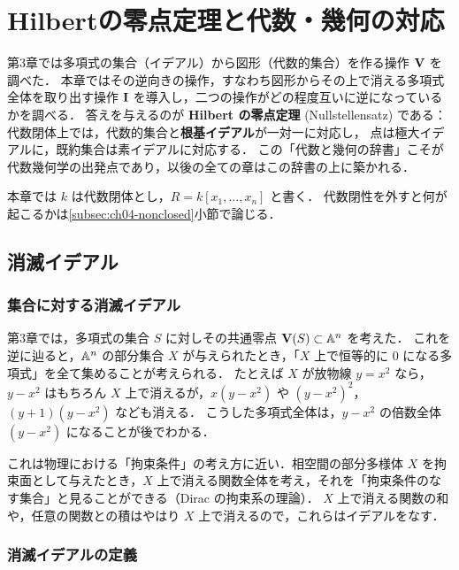 \chapter{Hilbertの零点定理と代数・幾何の対応}
\label{ch:ch04}

\begin{chapterlead}
第3章では多項式の集合（イデアル）から図形（代数的集合）を作る操作 $\mathbf{V}$ を調べた．
本章ではその逆向きの操作，すなわち図形からその上で消える多項式全体を取り出す操作 $\mathbf{I}$ を導入し，二つの操作がどの程度互いに逆になっているかを調べる．
答えを与えるのが \textbf{Hilbert の零点定理} (Nullstellensatz) である：代数閉体上では，代数的集合と\textbf{根基イデアル}が一対一に対応し，
点は極大イデアルに，既約集合は素イデアルに対応する．
この「代数と幾何の辞書」こそが代数幾何学の出発点であり，以後の全ての章はこの辞書の上に築かれる．
\end{chapterlead}

本章では $k$ は代数閉体とし，$R=k[x_1,\dots,x_n]$ と書く．
代数閉性を外すと何が起こるかは\ref{subsec:ch04-nonclosed}小節で論じる．

\section{消滅イデアル}

\subsection{集合に対する消滅イデアル}

第3章では，多項式の集合 $S$ に対しその共通零点 $\mathbf{V}(S)\subset\mathbb{A}^n$ を考えた．
これを逆に辿ると，$\mathbb{A}^n$ の部分集合 $X$ が与えられたとき，「$X$ 上で恒等的に $0$ になる多項式」を全て集めることが考えられる．
たとえば $X$ が放物線 $y=x^2$ なら，$y-x^2$ はもちろん $X$ 上で消えるが，$x(y-x^2)$ や $(y-x^2)^2$，$(y+1)(y-x^2)$ なども消える．
こうした多項式全体は，$y-x^2$ の倍数全体 $(y-x^2)$ になることが後でわかる．

これは物理における「拘束条件」の考え方に近い．相空間の部分多様体 $X$ を拘束面として与えたとき，$X$ 上で消える関数全体を考え，それを「拘束条件のなす集合」と見ることができる（Dirac の拘束系の理論）．
$X$ 上で消える関数の和や，任意の関数との積はやはり $X$ 上で消えるので，これらはイデアルをなす．

\subsection{消滅イデアルの定義}

